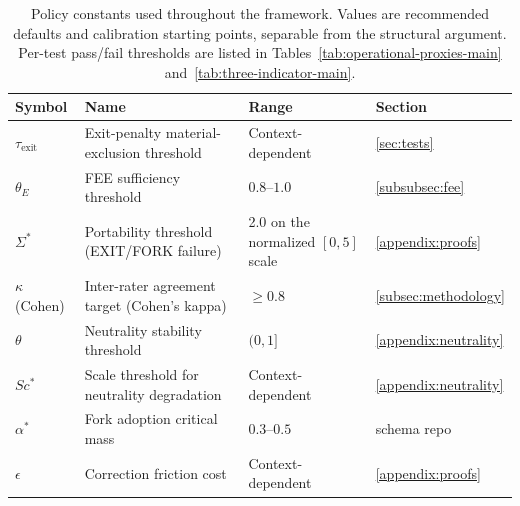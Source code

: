 \documentclass{article}
\begin{document}
\begin{table}[htbp]
\centering
\small
\caption{Policy constants used throughout the framework. Values are recommended defaults and calibration starting points, separable from the structural argument. Per-test pass/fail thresholds are listed in Tables~\ref{tab:operational-proxies-main} and~\ref{tab:three-indicator-main}.}
\label{tab:policy-constants}
\begin{tabular}{@{}llll@{}}
\toprule
\textbf{Symbol} & \textbf{Name} & \textbf{Range} & \textbf{Section} \\
\midrule
$\tau_{\text{exit}}$ & Exit-penalty material-exclusion threshold & Context-dependent & \ref{sec:tests} \\
$\theta_E$ & FEE sufficiency threshold & $0.8$--$1.0$ & \ref{subsubsec:fee} \\
$\Sigma^*$ & Portability threshold (EXIT/FORK failure) & 2.0 on the normalized $[0,5]$ scale & \ref{appendix:proofs} \\
$\kappa$ (Cohen) & Inter-rater agreement target (Cohen's kappa) & $\geq 0.8$ & \ref{subsec:methodology} \\
$\theta$ & Neutrality stability threshold & $(0, 1]$ & \ref{appendix:neutrality} \\
$Sc^*$ & Scale threshold for neutrality degradation & Context-dependent & \ref{appendix:neutrality} \\
$\alpha^*$ & Fork adoption critical mass & $0.3$--$0.5$ & schema repo \\
$\epsilon$ & Correction friction cost & Context-dependent & \ref{appendix:proofs} \\
\bottomrule
\end{tabular}
\end{table}
\end{document}
